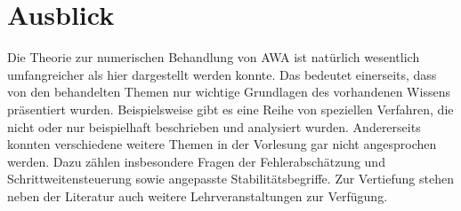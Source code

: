 \section{Ausblick}

Die Theorie zur numerischen Behandlung von AWA ist natürlich wesentlich umfangreicher als hier dargestellt werden konnte. Das bedeutet einerseits, dass von den behandelten Themen nur wichtige Grundlagen des vorhandenen Wissens präsentiert wurden. Beispielsweise gibt es eine Reihe von speziellen Verfahren, die nicht oder nur beispielhaft beschrieben und analysiert wurden. Andererseits konnten verschiedene weitere Themen in der Vorlesung gar nicht angesprochen werden. Dazu zählen insbesondere Fragen der Fehlerabschätzung und Schrittweitensteuerung sowie angepasste Stabilitätsbegriffe. Zur Vertiefung stehen neben der Literatur auch weitere Lehrveranstaltungen zur Verfügung.